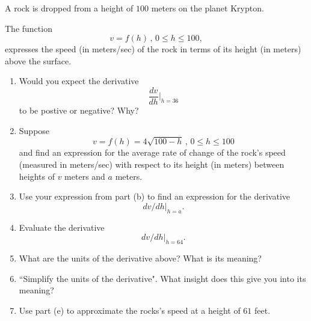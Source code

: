 \documentclass{ximera}
\begin{document}
\begin{question}  \label{Qdfgg4t66}
A rock is dropped from a height of $100$ meters on the planet Krypton.

The function
\[
     v = f(h) \, , \, 0\leq h \leq 100 ,
\]
expresses the speed (in meters/sec) of the rock in terms of its height (in meters) above the surface.

\begin{enumerate}
\item Would you expect the derivative 
\[
  \frac{dv}{dh}\Big|_{h=36}
\]
to be postive or negative? Why?

\item Suppose
\[
     v = f(h)  = 4\sqrt{100-h} \, , \, 0\leq h \leq 100
\]
and find an expression for the average rate of change of the rock's speed (measured in meters/sec) with respect to its height (in meters) between heights of $v$ meters and $a$ meters.

\item Use your expression from part (b) to find an expression for the derivative 
\[
   dv/dh \Big|_{h=a}. 
\]

\item Evaluate the derivative
\[
       dv/dh \Big|_{h=64} .
\]

\item What are the units of the derivative above? What is its meaning?

\item ``Simplify the units of the derivative". What insight does this give you into its meaning?

\item Use part (e) to approximate the rocks's speed at a height of $61$ feet.


\end{enumerate}
\end{question}
\end{document}
